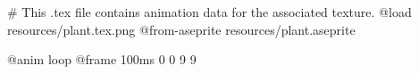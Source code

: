# This .tex file contains animation data for the associated texture.
@load resources/plant.tex.png
@from-aseprite resources/plant.aseprite

@anim loop
	@frame 100ms 0 0 9 9
